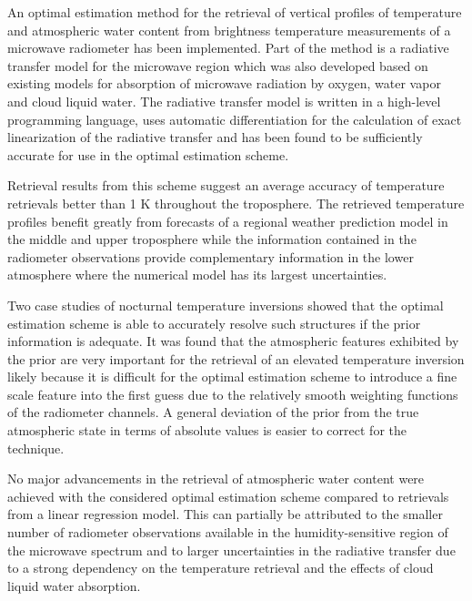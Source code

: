 \startsection[title=Conclusions]

    An optimal estimation method for the retrieval of vertical profiles of
    temperature and atmospheric water content from brightness temperature
    measurements of a microwave radiometer has been implemented. Part of the
    method is a radiative transfer model for the microwave region which was
    also developed based on existing models for absorption of microwave
    radiation by oxygen, water vapor and cloud liquid water. The radiative
    transfer model is written in a high-level programming language, uses
    automatic differentiation for the calculation of exact linearization of the
    radiative transfer and has been found to be sufficiently accurate for use in
    the optimal estimation scheme.

    Retrieval results from this scheme suggest an average accuracy of
    temperature retrievals better than 1 K throughout the troposphere. The
    retrieved temperature profiles benefit greatly from forecasts of a
    regional weather prediction model in the middle and upper troposphere
    while the information contained in the radiometer observations provide
    complementary information in the lower atmosphere where the numerical model
    has its largest uncertainties.
    
    Two case studies of nocturnal temperature inversions showed that the
    optimal estimation scheme is able to accurately resolve such structures
    if the prior information is adequate. It was found that the atmospheric
    features exhibited by the prior are very important for the retrieval
    of an elevated temperature inversion likely because it is difficult for
    the optimal estimation scheme to introduce a fine scale feature into
    the first guess due to the relatively smooth weighting functions of the
    radiometer channels. A general deviation of the prior from the true
    atmospheric state in terms of absolute values is easier to correct
    for the technique.

    No major advancements in the retrieval of atmospheric water content were
    achieved with the considered optimal estimation scheme compared to
    retrievals from a linear regression model. This can partially be attributed
    to the smaller number of radiometer observations available in the
    humidity-sensitive region of the microwave spectrum and to larger
    uncertainties in the radiative transfer due to a strong dependency on
    the temperature retrieval and the effects of cloud liquid water absorption.

